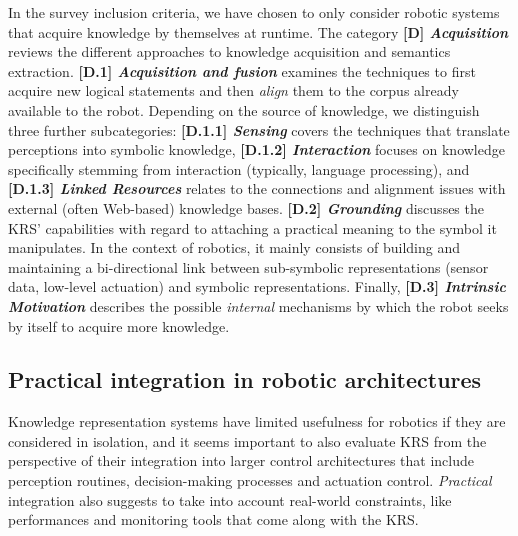 \documentclass[journal]{IEEEtran}
\newcommand{\taxon}[2]{%
    \textbf{[#1] \emph{#2}}
}
\begin{document}
In the survey inclusion criteria, we have chosen to only consider robotic
systems that acquire knowledge by themselves at runtime. The category
\taxon{D}{Acquisition} reviews the different approaches to knowledge acquisition
and semantics extraction. \taxon{D.1}{Acquisition and fusion} examines the
techniques to first acquire new logical statements and then \emph{align} them to
the corpus already available to the robot. Depending on the source of knowledge,
we distinguish three further subcategories: \taxon{D.1.1}{Sensing} covers the
techniques that translate perceptions into symbolic knowledge,
\taxon{D.1.2}{Interaction} focuses on knowledge specifically stemming from
interaction (typically, language processing), and \taxon{D.1.3}{Linked
Resources} relates to the connections and alignment issues with external
(often Web-based) knowledge bases.
% 
\taxon{D.2}{Grounding} discusses the KRS' capabilities with regard to attaching a
practical meaning to the symbol it manipulates. In the context of robotics, it
mainly consists of building and maintaining a bi-directional link between
sub-symbolic representations (sensor data, low-level actuation) and symbolic
representations.
% 
Finally, \taxon{D.3}{Intrinsic Motivation} describes the possible
\emph{internal} mechanisms by which the robot seeks by itself to acquire more
knowledge.




\subsection{Practical integration in robotic architectures}
\label{sect|integration-robot}

Knowledge representation systems have limited usefulness for robotics if they are
considered in isolation, and it seems important to also evaluate KRS from the
perspective of their integration into larger control architectures that include
perception routines, decision-making processes and actuation control.
\emph{Practical} integration also suggests to take into account real-world
constraints, like performances and monitoring tools that come along with the KRS.
\end{document}
